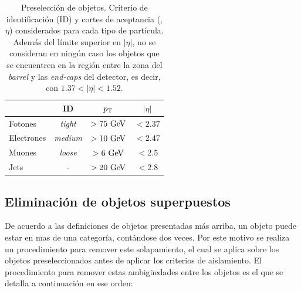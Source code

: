 \begin{table}[!htbp]
  \centering

  \caption{Preselección de objetos. Criterio de identificación (ID) y cortes de
    aceptancia (\pt, $\eta$) considerados para cada tipo de partícula. Además
    del límite superior en $|\eta|$, no se consideran en ningún caso los objetos
    que se encuentren en la región entre la zona del \emph{barrel} y las \emph{end-caps} del detector, es
    decir, con $1.37 < |\eta| < 1.52$.}
  \label{tab:base_sel}

  \begin{tabularx}{0.8\textwidth}{LCCC}
    \hline
    & ID & $p_{\mathrm{T}}$ & $|\eta|$ \\
    \hline
    Fotones    & \emph{tight}  & $> 75 \gev$ & $<2.37$ \\
    Electrones & \emph{medium} & $> 10 \gev$ & $<2.47$ \\
    Muones     & \emph{loose}  & $> 6  \gev$ & $<2.5$  \\
    Jets       & -             & $> 20 \gev$ & $<2.8$  \\
    \hline
  \end{tabularx}

\end{table}





\subsection{Eliminación de objetos superpuestos} %
\label{sec:overlap_romoval_event_veto}

De acuerdo a las definiciones de objetos presentadas más arriba, un objeto puede estar en
mas de una categoría, contándose dos veces. Por este motivo se realiza un
procedimiento para remover este solapamiento, el cual se aplica sobre los
objetos preseleccionados antes de aplicar los criterios de aislamiento. El
procedimiento para remover estas ambigüedades entre los objetos es el que se
detalla a continuación en ese orden:

